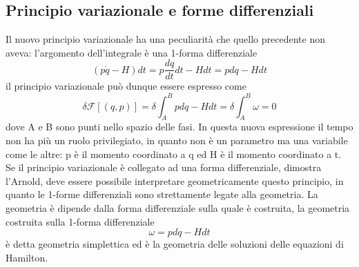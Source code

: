 \documentclass[
10pt, %
a4paper, %
oneside, %
headinclude,footinclude, %
BCOR5mm, %
]{scrartcl}
\begin{document}
\subsection{Principio variazionale e forme differenziali}
Il nuovo principio variazionale ha una peculiarità che quello precedente non aveva: l'argomento dell'integrale è una 1-forma differenziale
\[(p\dot{q}-H)dt = p\frac{dq}{dt}dt-Hdt = pdq-Hdt\]
il principio variazionale può dunque essere espresso come
\[\delta\mathcal{F}[(q, p)] = \delta\int_{A}^{B}pdq-Hdt = \delta\int_{A}^{B}\omega = 0\]
dove A e B sono punti nello spazio delle fasi. In questa nuova espressione il tempo non ha più un ruolo privilegiato, in quanto non è un parametro ma una variabile come le altre: p è il momento coordinato a q ed H è il momento coordinato a t. Se il principio variazionale è collegato ad una forma differenziale, dimostra l'Arnold, deve essere possibile interpretare geometricamente questo principio, in quanto le 1-forme differenziali sono strettamente legate alla geometria. La geometria è dipende dalla forma differenziale sulla quale è costruita, la geometria costruita sulla 1-forma differenziale
\[\omega  =   p{dq}-Hdt\] 
è detta geometria simplettica ed è la geometria delle soluzioni delle equazioni di Hamilton.\\\\
\end{document}
